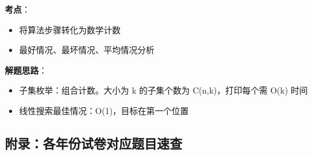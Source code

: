 \documentclass[10pt,a4paper,openany]{ctexbook}
\theoremstyle{definition}
\theoremstyle{remark}
\begin{document}
\textbf{考点}：
\begin{itemize}
\item 将算法步骤转化为数学计数
\item 最好情况、最坏情况、平均情况分析

\end{itemize}

\textbf{解题思路}：
\begin{itemize}
\item 子集枚举：组合计数。大小为 k 的子集个数为 C(n,k)，打印每个需 O(k) 时间
\item 线性搜索最佳情况：O(1)，目标在第一个位置

\end{itemize}

\vspace{-2pt}

\subsection{附录：各年份试卷对应题目速查}
\end{document}
